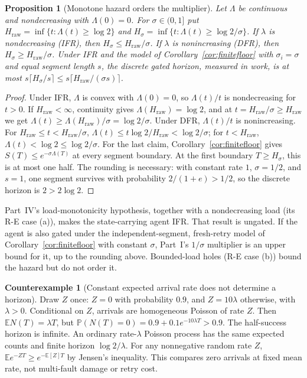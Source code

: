 \documentclass[11pt]{article}
\newtheorem{proposition}[theorem]{Proposition}
\theoremstyle{definition}
\newtheorem{example}[theorem]{Counterexample}
\theoremstyle{remark}
\newcommand{\Prb}{\mathbb P}
\newcommand{\E}{\mathbb E}
\begin{document}
\begin{proposition}[Monotone hazard orders the multiplier]\label{prop:monotone}
Let $\Lambda$ be continuous and nondecreasing with $\Lambda(0)=0$. For $\sigma\in(0,1]$ put
$H_{\mathrm{raw}}=\inf\{t:\Lambda(t)\ge\log2\}$ and $H_\sigma=\inf\{t:\Lambda(t)\ge\log2/\sigma\}$.
If $\lambda$ is nondecreasing (IFR), then $H_\sigma\le H_{\mathrm{raw}}/\sigma$.
If $\lambda$ is nonincreasing (DFR), then $H_\sigma\ge H_{\mathrm{raw}}/\sigma$.
Under IFR and the model of Corollary~\ref{cor:finitefloor} with $\sigma_i=\sigma$ and equal
segment length $s$, the discrete gated horizon, measured in work, is at most
$s\lceil H_\sigma/s\rceil\le s\lceil H_{\mathrm{raw}}/(\sigma s)\rceil$.
\end{proposition}
\begin{proof}
Under IFR, $\Lambda$ is convex with $\Lambda(0)=0$, so $\Lambda(t)/t$ is nondecreasing for $t>0$.
If $H_{\mathrm{raw}}<\infty$, continuity gives $\Lambda(H_{\mathrm{raw}})=\log2$, and at
$t=H_{\mathrm{raw}}/\sigma\ge H_{\mathrm{raw}}$ we get $\Lambda(t)\ge\Lambda(H_{\mathrm{raw}})/\sigma
=\log2/\sigma$. Under DFR, $\Lambda(t)/t$ is nonincreasing. For
$H_{\mathrm{raw}}\le t<H_{\mathrm{raw}}/\sigma$, $\Lambda(t)\le t\log2/H_{\mathrm{raw}}<\log2/\sigma$;
for $t<H_{\mathrm{raw}}$, $\Lambda(t)<\log2\le\log2/\sigma$. For the last claim,
Corollary~\ref{cor:finitefloor} gives $S(T)\le e^{-\sigma\Lambda(T)}$ at every segment boundary.
At the first boundary $T\ge H_\sigma$, this is at most one half. The rounding is necessary:
with constant rate $1$, $\sigma=1/2$, and $s=1$, one segment survives with probability
$2/(1+e)>1/2$, so the discrete horizon is $2>2\log2$.
\end{proof}
Part~IV's load-monotonicity hypothesis, together with a nondecreasing load (its R-E case (a)),
makes the state-carrying agent IFR. That result is ungated. If the agent is also gated under the
independent-segment, fresh-retry model of Corollary~\ref{cor:finitefloor} with constant $\sigma$,
Part~I's $1/\sigma$ multiplier is an upper bound for it, up to the rounding above.
Bounded-load holes (R-E case (b)) bound the hazard but do not order it.

\begin{example}[Constant expected arrival rate does not determine a horizon]\label{ex:latent}
Draw $Z$ once: $Z=0$ with probability $0.9$, and $Z=10\lambda$ otherwise, with $\lambda>0$.
Conditional on $Z$, arrivals are homogeneous Poisson of rate $Z$. Then $\E N(T)=\lambda T$,
but $\Prb(N(T)=0)=0.9+0.1e^{-10\lambda T}>0.9$. The half-success horizon is infinite.
An ordinary rate-$\lambda$ Poisson process has the same expected counts and finite horizon
$\log2/\lambda$. For any nonnegative random rate $Z$,
$\E e^{-ZT}\ge e^{-\E[Z]T}$ by Jensen's inequality. This compares zero arrivals at fixed
mean rate, not multi-fault damage or retry cost.
\end{example}
\end{document}
